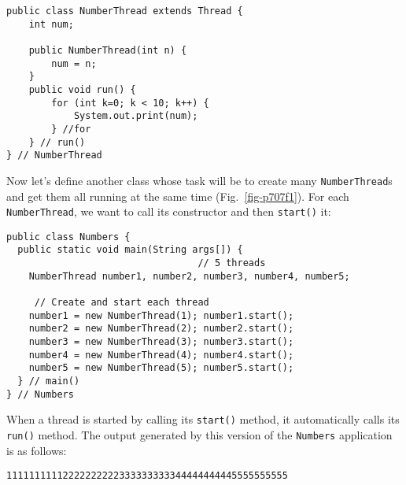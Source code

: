 \begin{jjjlisting}
\begin{lstlisting}
public class NumberThread extends Thread {
    int num;

    public NumberThread(int n) {
        num = n;
    }
    public void run() {
        for (int k=0; k < 10; k++) {
            System.out.print(num);
        } //for
    } // run()
} // NumberThread
\end{lstlisting}
\end{jjjlisting}

\begin{figure}[tb]
\end{figure}

\noindent Now let's define another class whose task will be to 
create many \mbox{\tt NumberThread}s and get them all running at the
same time (Fig.~\ref{fig-p707f1}).  For each {\tt NumberThread}, we
want to call its constructor and then {\tt start()} it:

\begin{jjjlisting}[27pc]
\begin{lstlisting}
public class Numbers {
  public static void main(String args[]) {
                                  // 5 threads
    NumberThread number1, number2, number3, number4, number5; 

     // Create and start each thread
    number1 = new NumberThread(1); number1.start(); 
    number2 = new NumberThread(2); number2.start();
    number3 = new NumberThread(3); number3.start();
    number4 = new NumberThread(4); number4.start();
    number5 = new NumberThread(5); number5.start();
  } // main()
} // Numbers
\end{lstlisting}
\end{jjjlisting}

\noindent When a thread is started by calling its {\tt start()}
method, it automatically calls its
{\tt run()} method.  The output generated by this version of the
{\tt Numbers} application is as follows:

\begin{jjjlisting}
\begin{lstlisting}
11111111112222222222333333333344444444445555555555
\end{lstlisting}
\end{jjjlisting}

